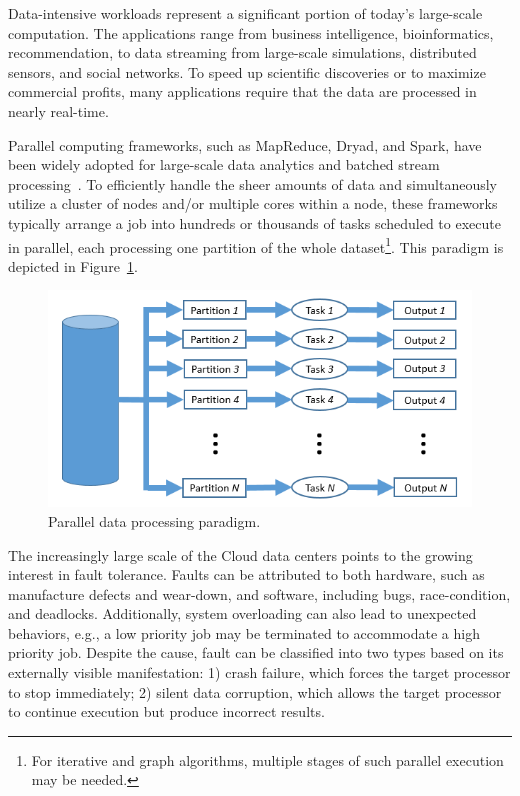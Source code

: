 Data-intensive workloads represent a significant portion of today's large-scale computation. The applications range from business intelligence, bioinformatics, recommendation, to data streaming from large-scale simulations, distributed sensors, and social networks. To speed up scientific discoveries or to maximize commercial profits, many applications require that the data are processed in nearly real-time. 

Parallel computing frameworks, such as MapReduce, Dryad, and Spark, have been widely adopted for large-scale data analytics and batched stream processing~\cite{Dean2004,Isard2007,Zaharia180560,Bhatotia2011}. To efficiently handle the sheer amounts of data and simultaneously utilize a cluster of nodes and/or multiple cores within a node, these frameworks typically arrange a job into hundreds or thousands of tasks scheduled to execute in parallel, each processing one partition of the whole dataset\footnote{For iterative and graph algorithms, multiple stages of such parallel execution may be needed.}. This paradigm is depicted in Figure~\ref{fig:engine}.

\begin{figure}[!t]
  \begin{center}
      \includegraphics[width=0.8\columnwidth]{figures/engine}
  \end{center}
  \vskip -0.1in
  \caption{Parallel data processing paradigm.}
  \label{fig:engine}
  \vspace{-0.1in}
\end{figure}

The increasingly large scale of the Cloud data centers points to the growing interest in fault tolerance. Faults can be attributed to both hardware, such as manufacture defects and wear-down, and software, including bugs, race-condition, and deadlocks. Additionally, system overloading can also lead to unexpected behaviors, e.g., a low priority job may be terminated to accommodate a high priority job. Despite the cause, fault can be classified into two types based on its externally visible manifestation: 1) crash failure, which forces the target processor to stop immediately; 2) silent data corruption, which allows the target processor to continue execution but produce incorrect results.  

